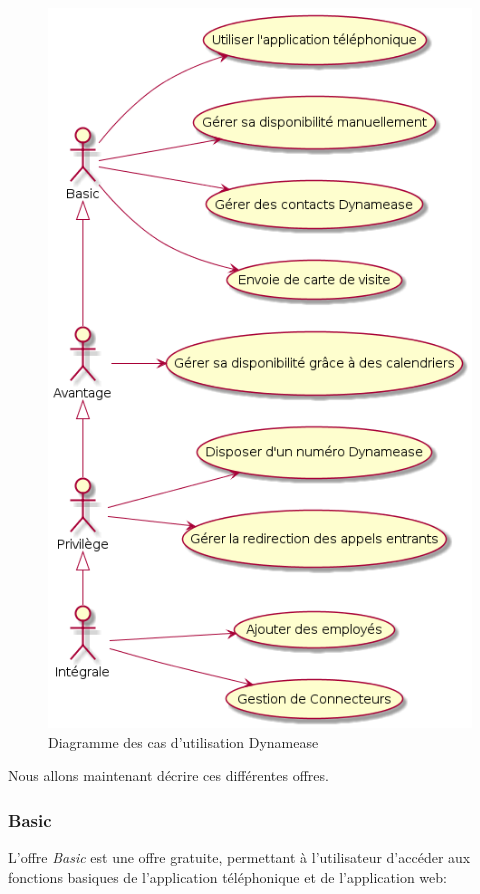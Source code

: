 \begin{figure}[!h]
	\centering
	\includegraphics[scale=0.5]{img/useCase.png}
	\caption{\label{useCase} Diagramme des cas d'utilisation Dynamease}
\end{figure}

Nous allons maintenant décrire ces différentes offres.

\subsubsection{Basic}

L'offre \textit{Basic} est une offre gratuite, permettant à l'utilisateur d'accéder aux fonctions basiques de l'application téléphonique et de l'application web:

